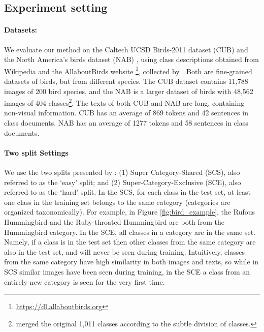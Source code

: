 \documentclass[11pt,a4paper]{article}
\begin{document}
\subsection{Experiment setting}

\paragraph{Datasets:} We evaluate our method on the Caltech UCSD Birds-2011 dataset (CUB) \citet{wah2011caltech} and the North America’s birds dataset (NAB) \cite{van2015building}, using class descriptions obtained from Wikipedia and the AllaboutBirds website \footnote{\url{https://dl.allaboutbirds.org}}, collected by \citet{elhoseiny2017link}. 
Both are fine-grained datasets of birds, but from different species. %
The CUB dataset contains 11,788 images of 200 bird species, and the NAB
is a larger dataset of birds with 48,562 images of 404 classes\footnote{\citet{elhoseiny2017link} merged the original 1,011 classes according to the subtle division of classes.}.
The texts of both CUB and NAB are long, containing non-visual information. CUB has an average of 869 tokens and 42 sentences in class documents. NAB has an average of 1277 tokens and 58 sentences in class documents. 

\paragraph{Two split Settings} We use the two splits presented by \citet{elhoseiny2017link}: (1) Super Category-Shared (SCS), also referred to as the \enquote*{easy} split; and (2) Super-Category-Exclusive (SCE), also referred to as the \enquote*{hard} split. In the SCS, for each class in the test set, at least one class in the training set belongs to the same category (categories are organized taxonomically). For example, in Figure \ref{fig:bird_example}, the Rufous Hummingbird and the Ruby-throated Hummingbird are both from the Hummingbird category. In the SCE, all classes in a category are in the same set. Namely, if a class is in the test set then other classes from the same category are also in the test set, and will never be seen during training. Intuitively, classes from the same category have high similarity in both images and texts, so while in SCS similar images have been seen during training, in the SCE a class from an entirely new category is seen for the very first time. %
\end{document}
